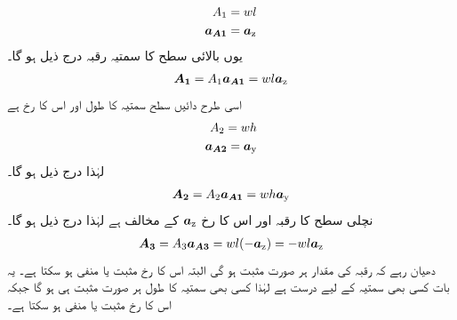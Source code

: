 %
\begin{align*}
A_1&=wl\\
{{\boldsymbol{a_{A1}}}}&={\boldsymbol{a}}_{\textup{z}}
\end{align*}
یوں بالائی سطح کا سمتیہ رقبہ درج ذیل ہو گا۔
\begin{align}
{\ensuremath{{\boldsymbol{A_1}}}}=A_1 {{\boldsymbol{a_{A1}}}}= w l {\boldsymbol{a}}_{\textup{z}}
\end{align}
اسی طرح دائیں  سطح  سمتیہ  کا طول   اور اس کا رخ  ہے
\begin{align*}
A_2=wh\\
{{\boldsymbol{a_{A2}}}}={\boldsymbol{a}}_{\textup{y}}
\end{align*}
لہٰذا درج ذیل ہو گا۔
\begin{align}
{\ensuremath{{\boldsymbol{A_2}}}}=A_2 {{\boldsymbol{a_{A1}}}}=w h {\boldsymbol{a}}_{\textup{y}}
\end{align}
نچلی سطح کا رقبہ   اور اس کا رخ  ${\boldsymbol{a}}_{\textup{z}}$ کے مخالف  ہے لہٰذا درج ذیل ہو گا۔
\begin{align}
{\ensuremath{{\boldsymbol{A_3}}}}=A_3 {{\boldsymbol{a_{A3}}}}=wl (-{\boldsymbol{a}}_{\textup{z}})=-wl {\boldsymbol{a}}_{\textup{z}}
\end{align}
دھیان  رہے کہ رقبہ کی مقدار ہر صورت  مثبت ہو گی البتہ اس کا رخ مثبت یا منفی ہو سکتا ہے۔ یہ بات کسی بھی سمتیہ کے لیے درست ہے لہٰذا کسی بھی سمتیہ کا طول ہر صورت  مثبت ہی ہو گا جبکہ  اس کا رخ  مثبت یا منفی ہو سکتا  ہے۔

